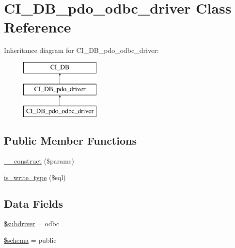 \hypertarget{class_c_i___d_b__pdo__odbc__driver}{}\section{C\+I\+\_\+\+D\+B\+\_\+pdo\+\_\+odbc\+\_\+driver Class Reference}
\label{class_c_i___d_b__pdo__odbc__driver}
Inheritance diagram for C\+I\+\_\+\+D\+B\+\_\+pdo\+\_\+odbc\+\_\+driver\+:\begin{figure}[H]
\begin{center}
\leavevmode
\includegraphics[height=3.000000cm]{class_c_i___d_b__pdo__odbc__driver}
\end{center}
\end{figure}
\subsection*{Public Member Functions}
\begin{DoxyCompactItemize}
\item 
\mbox{\hyperlink{class_c_i___d_b__pdo__odbc__driver_a9162320adff1a1a4afd7f2372f753a3e}{\+\_\+\+\_\+construct}} (\$params)
\item 
\mbox{\hyperlink{class_c_i___d_b__pdo__odbc__driver_af435df5703c238769d6d16fde6d51182}{is\+\_\+write\+\_\+type}} (\$sql)
\end{DoxyCompactItemize}
\subsection*{Data Fields}
\begin{DoxyCompactItemize}
\item 
\mbox{\hyperlink{class_c_i___d_b__pdo__odbc__driver_a1322ca756348b11d080cb7a4f590de15}{\$subdriver}} = \textquotesingle{}odbc\textquotesingle{}
\item 
\mbox{\hyperlink{class_c_i___d_b__pdo__odbc__driver_a83022b1d70799d2bde3d64dca9cb40ee}{\$schema}} = \textquotesingle{}public\textquotesingle{}
\end{DoxyCompactItemize}
